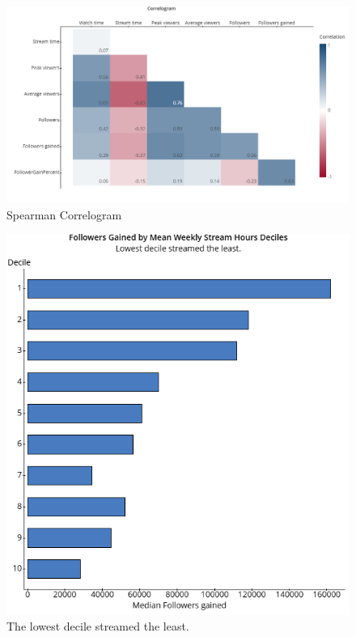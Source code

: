 \documentclass[12pt]{article}
\begin{document}
\begin{figure}[ht]
  \centering
  \includegraphics[width=\linewidth, height=0.4\textheight]{../StatCrunch_Results/spearman_correlogram}
  \captionsetup{justification=centering, singlelinecheck=false, margin=2cm}
  \caption[Spearman Correlogram]{Spearman Correlogram}
  \label{fig:spearman_correlogram}
\end{figure}



\begin{figure}
  \centering
  \includegraphics[width=0.8\linewidth, height=0.4\textheight]{../StatCrunch_Results/followers_gained_stream_deciles}
  \captionsetup{justification=centering, singlelinecheck=false, margin=2cm}
  \caption[Followers Gained by Stream Time Deciles]{The lowest decile streamed the least.}
  \label{fig:followers_gained_stream_deciles}
\end{figure}
\end{document}
